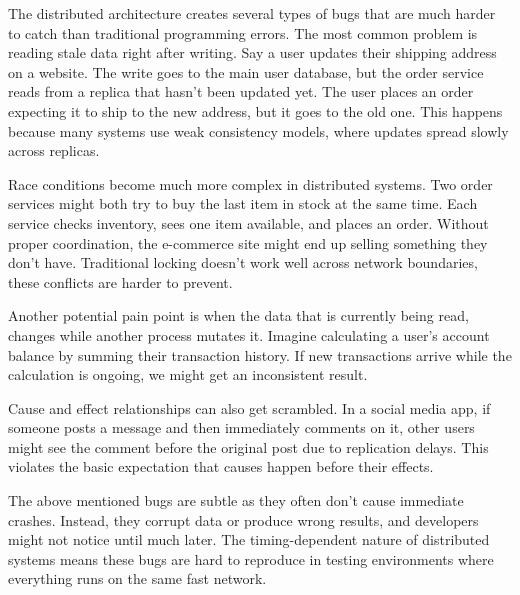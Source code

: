 The distributed architecture creates several types of bugs that are
much harder to catch than traditional programming errors. The most
common problem is reading stale data right after writing.
Say a user updates their shipping address on a website. The write
goes to the main user database, but the order service reads from a
replica that hasn't been updated yet. The user places an order
expecting it to ship to the new address, but it goes to the old one.
This happens because many systems use weak consistency models, where
updates spread slowly across replicas.

Race conditions become much more complex in distributed systems.
Two order services might both try to buy the last item in stock at
the same time. Each service checks inventory, sees one item available,
and places an order. Without proper coordination, the e-commerce site
might end up selling
something they don't have. Traditional locking doesn't work well
across network boundaries, these conflicts are harder to prevent.

Another potential pain point is when the data that is currently being
read, changes while another process mutates it. Imagine calculating a
user's account balance by summing their transaction history. If new
transactions arrive while the calculation is ongoing, we might get an
inconsistent result.

Cause and effect relationships can also get scrambled. In a social
media app, if someone posts a message and then immediately comments
on it, other users might see the comment before the original post
due to replication delays. This violates the basic expectation that
causes happen before their effects.

The above mentioned bugs are subtle as they often don't cause
immediate crashes. Instead, they corrupt data or produce wrong results,
and developers might not notice until much later. The timing-dependent nature
of distributed systems means these bugs are hard to reproduce in testing
environments where everything runs on the same fast network.

